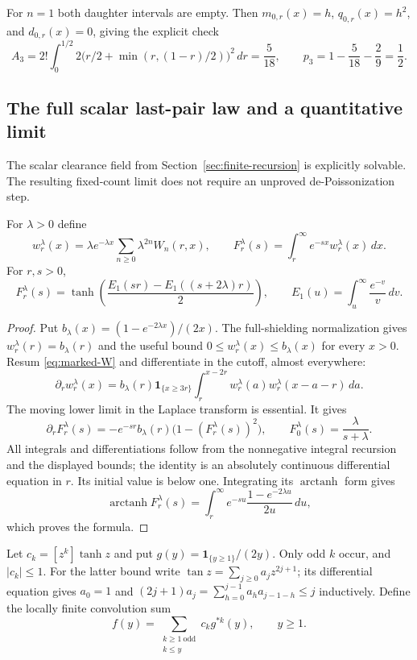 \documentclass[11pt,letterpaper]{article}
\newcommand{\ind}{\mathbf 1}\newcommand{\Exp}{\operatorname{Exp}}
\begin{document}
For $n=1$ both daughter intervals are empty. Then $m_{0,r}(x)=h$,
$q_{0,r}(x)=h^2$, and $d_{0,r}(x)=0$, giving the explicit check
\[
 A_3=2!\int_0^{1/2}2\big(r/2+\min(r,(1-r)/2)\big)^2\,dr
     =\frac5{18},\qquad p_3=1-\frac5{18}-\frac29=\frac12.
\]

\subsection{The full scalar last-pair law and a quantitative limit}
\label{sec:scalar-limit}

The scalar clearance field from Section~\ref{sec:finite-recursion} is
explicitly solvable. The resulting fixed-count limit does not require
an unproved de-Poissonization step.

\begin{theorem}\label{thm:scalar-transform}
For $\lambda>0$ define
\[
 w_r^\lambda(x)=\lambda e^{-\lambda x}
       \sum_{n\ge0}\lambda^{2n}W_n(r,x),\qquad
 F_r^\lambda(s)=\int_r^\infty e^{-sx}w_r^\lambda(x)\,dx.
\]
For $r,s>0$,
\begin{equation}\label{eq:scalar-transform}
 F_r^\lambda(s)=\tanh\!\left(
 \frac{E_1(sr)-E_1((s+2\lambda)r)}2\right),\qquad
 E_1(u)=\int_u^\infty\frac{e^{-v}}v\,dv.
\end{equation}
\end{theorem}
\begin{proof}
Put $b_\lambda(x)=(1-e^{-2\lambda x})/(2x)$. The full-shielding
normalization gives $w_r^\lambda(r)=b_\lambda(r)$ and the useful bound
$0\le w_r^\lambda(x)\le b_\lambda(x)$ for every $x>0$.
Resum \eqref{eq:marked-W} and differentiate in the cutoff, almost everywhere:
\[
 \partial_r w_r^\lambda(x)=b_\lambda(r)\ind_{\{x\ge3r\}}
       \int_r^{x-2r}w_r^\lambda(a)w_r^\lambda(x-a-r)\,da.
\]
The moving lower limit in the Laplace transform is essential. It gives
\[
 \partial_r F_r^\lambda(s)
 =-e^{-sr}b_\lambda(r)\bigl(1-(F_r^\lambda(s))^2\bigr),
 \qquad F_0^\lambda(s)=\frac{\lambda}{s+\lambda}.
\]
All integrals and differentiations follow from the nonnegative integral
recursion and the displayed bounds; the identity is an absolutely
continuous differential equation in $r$. Its initial value is below one.
Integrating its $\operatorname{arctanh}$ form gives
\[
 \operatorname{arctanh}F_r^\lambda(s)
 =\int_r^\infty e^{-su}\frac{1-e^{-2\lambda u}}{2u}\,du,
\]
which proves the formula.
\end{proof}

Let $c_k=[z^k]\tanh z$ and put $g(y)=\ind_{\{y\ge1\}}/(2y)$.
Only odd $k$ occur, and $|c_k|\le1$. For the latter bound write
$\tan z=\sum_{j\ge0}a_jz^{2j+1}$; its differential equation gives
$a_0=1$ and $(2j+1)a_j=\sum_{h=0}^{j-1}a_ha_{j-1-h}\le j$
inductively. Define the locally finite convolution sum
\begin{equation}\label{eq:scalar-density-series}
 f(y)=\sum_{\substack{k\ge1\ \mathrm{odd}\\ k\le y}}c_k g^{*k}(y),
 \qquad y\ge1.
\end{equation}
\end{document}

